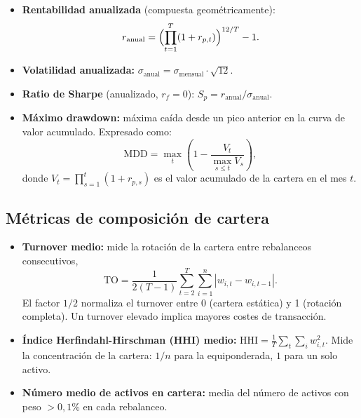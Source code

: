 \begin{itemize}
    \item \textbf{Rentabilidad anualizada} (compuesta geométricamente):
          \begin{equation}
              r_{\text{anual}} = \Bigl(\prod_{t=1}^{T} (1 + r_{p,t})
              \Bigr)^{12/T} - 1.
              \label{eq:rent-anual}
          \end{equation}
    \item \textbf{Volatilidad anualizada:}
          $\sigma_{\text{anual}} = \sigma_{\text{mensual}} \cdot \sqrt{12}$.
    \item \textbf{Ratio de Sharpe} (anualizado, $r_f = 0$):
          $S_p = r_{\text{anual}} / \sigma_{\text{anual}}$.
    \item \textbf{Máximo drawdown:} máxima caída desde un pico anterior en la
          curva de valor acumulado. Expresado como:
          \begin{equation}
              \text{MDD} = \max_{t} \left(
              1 - \frac{V_t}{\max_{s \le t} V_s}
              \right),
              \label{eq:mdd}
          \end{equation}
          donde $V_t = \prod_{s=1}^{t} (1 + r_{p,s})$ es el valor acumulado
          de la cartera en el mes $t$.
\end{itemize}

\subsection{Métricas de composición de cartera}

\begin{itemize}
    \item \textbf{Turnover medio:} mide la rotación de la cartera entre
          rebalanceos consecutivos,
          \begin{equation}
              \text{TO} = \frac{1}{2(T-1)} \sum_{t=2}^{T}
              \sum_{i=1}^{n} |w_{i,t} - w_{i,t-1}|.
              \label{eq:turnover}
          \end{equation}
          El factor $1/2$ normaliza el turnover entre 0 (cartera estática)
          y 1 (rotación completa). Un turnover elevado implica mayores costes
          de transacción.
    \item \textbf{Índice Herfindahl-Hirschman (HHI) medio:}
          $\text{HHI} = \frac{1}{T} \sum_t \sum_i w_{i,t}^2$.
          Mide la concentración de la cartera: $1/n$ para la equiponderada,
          $1$ para un solo activo.
    \item \textbf{Número medio de activos en cartera:} media del número de
          activos con peso $> 0{,}1\%$ en cada rebalanceo.
\end{itemize}

